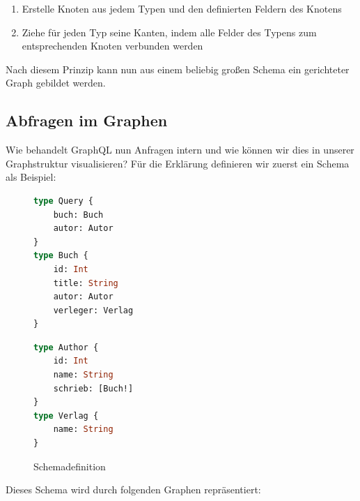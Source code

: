 \begin{enumerate}
    \item Erstelle Knoten aus jedem Typen und den definierten Feldern des Knotens
    \item Ziehe für jeden Typ seine Kanten, indem alle Felder des Typens zum entsprechenden Knoten verbunden werden
\end{enumerate}

Nach diesem Prinzip kann nun aus einem beliebig großen Schema ein gerichteter Graph gebildet werden.
\newpage

\subsection{Abfragen im Graphen}
\label{abfrgraph}

Wie behandelt GraphQL nun Anfragen intern und wie können wir dies in unserer Graphstruktur visualisieren?
Für die Erklärung definieren wir zuerst ein Schema als Beispiel:

\begin{figure}[htb]
    \centering
    \begin{minipage}[h!tb]{0.4\textwidth}
        \begin{lstlisting}[language=GraphQL]
type Query {
    buch: Buch
    autor: Autor
}
type Buch {
    id: Int
    title: String
    autor: Autor
    verleger: Verlag
}
        \end{lstlisting}
    \end{minipage}
    \hfill
    \begin{minipage}[h!tb]{0.4\textwidth}
        \begin{lstlisting}[language=GraphQL]
type Author {
    id: Int
    name: String
    schrieb: [Buch!]
}
type Verlag {
    name: String
}
        \end{lstlisting}
    \end{minipage}
    \label{schemdef}
    \caption{Schemadefinition}
\end{figure}

Dieses Schema wird durch folgenden Graphen repräsentiert: \\


